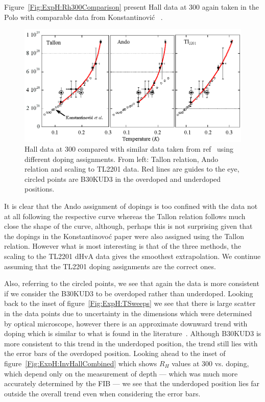 Figure~\ref{Fig:ExpH:Rh300Comparison} present Hall data at \unit{300}{\kelvin} again taken in the Polo with comparable data from Konstantinovi\'c \etal~\cite{Konstantinovic2001}.
\begin{figure}[htbp]
    \begin{center}
        \includegraphics[scale=1.0]{Chapter-HallBSCO/Figures/Rh300Comparison/Rh300Comparison}
        \caption{Hall data at \unit{300}{\kelvin} compared with similar data taken from ref~\cite{Konstantinovic2001} using different doping assignments. From left: Tallon relation, Ando relation and scaling to \ac{TL2201} data. Red lines are guides to the eye, circled points are B30KUD3 in the overdoped and underdoped positions.}
        \label{Fig:Rh300Comparison}
    \end{center}
\end{figure}
It is clear that the Ando assignment of dopings is too confined with the data not at all following the respective curve whereas the Tallon relation follows much close the shape of the curve, although, perhaps this is not surprising given that the dopings in the Konstantinovo\'c paper were also assigned using the Tallon relation. However what is most interesting is that of the three methods, the scaling to the \ac{TL2201} \ac{dHvA} data gives the smoothest extrapolation. We continue assuming that the \ac{TL2201} doping assignments are the correct ones.

Also, referring to the circled points, we see that again the data is more consistent if we consider the B30KUD3 to be overdoped rather than underdoped. Looking back to the inset of figure~\ref{Fig:ExpH:TSweeps} we see that there is large scatter in the data points due to uncertainty in the dimensions which were determined by optical microscope, however there is an approximate downward trend with doping which is similar to what is found in the literature~\cite{Ando2000, Ando1999, Konstantinovic2001, Ono2000}. Although B30KUD3 is more consistent to this trend in the underdoped position, the trend still lies with the error bars of the overdoped position. Looking ahead to the inset of figure~\ref{Fig:ExpH:InvHallCombined} which shows $R_H$ values at \unit{300}{\kelvin} vs. doping, which depend only on the measurement of depth --- which was much more accurately determined by the \ac{FIB} --- we see that the underdoped position lies far outside the overall trend even when considering the error bars. 

